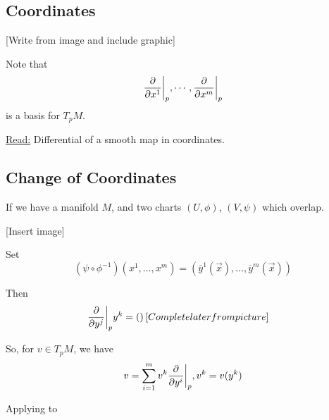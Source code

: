 \documentclass{article}
\newcommand{\restr}[2]{{%
  \left.\kern-\nulldelimiterspace %
  #1 %
  \vphantom{\big|} %
  \right|_{#2} %
  }}
\begin{document}
\vskip 1cm
\subsection{Coordinates}

\vskip 0.5cm
[Write from image and include graphic]

\vskip 0.5cm
Note that
\[ \restr{\frac{\partial}{\partial x^1}}{p}, \cdots, \restr{\frac{\partial}{\partial x^m}}{p} \]
is a basis for $T_pM$.

\vskip 0.5cm
\underline{Read:} Differential of a smooth map in coordinates.

\vskip 0.5cm
\subsection*{Change of Coordinates}
If we have a manifold $M$, and two charts $(U, \phi)$, $(V, \psi)$ which overlap. 

\vskip 0.5cm
[Insert image]

\vskip 0.5cm
Set 
\[ \left( \psi \circ \phi^{-1} \right)(x^1, \dots, x^m) = \left( \overline{y}^1(\vec{x}), \dots, \overline{y}^m(\vec{x}) \right)  \]

Then 
\begin{align*}
  \restr{\frac{\partial}{\partial y^j}}{p} y^k &= \left(  \right)
  [Complete later from picture]
\end{align*}

So, for $v \in T_p M$, we have 
\begin{align*}
  v &= \sum_{i = 1}^m v^k \restr{\frac{\partial}{\partial y^i}}{p}, v^k = v(y^k)\\
\end{align*}

Applying to
\end{document}
